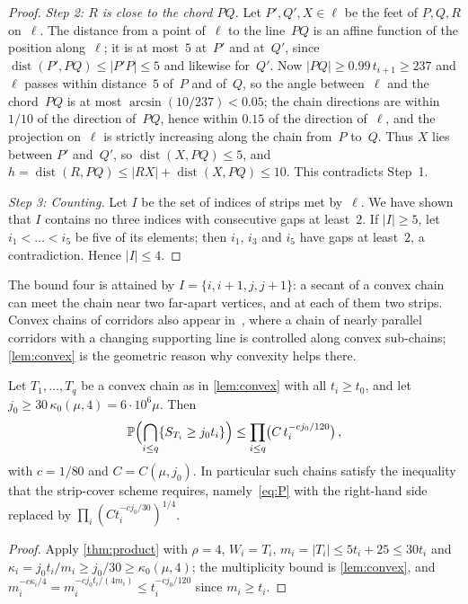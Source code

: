 \documentclass[11pt,letterpaper]{article}
\DeclareMathOperator{\dist}{dist}
\begin{document}
\begin{proof}
\emph{Step 2: $R$ is close to the chord $PQ$.} Let $P',Q',X\in\ell$ be the feet of $P,Q,R$ on~$\ell$. The distance from a point of~$\ell$ to the line~$PQ$ is an affine function of the position along~$\ell$; it is at most~$5$ at~$P'$ and at~$Q'$, since $\dist(P',PQ)\le\lvert P'P\rvert\le5$ and likewise for~$Q'$. Now $\lvert PQ\rvert\ge0.99\,t_{i+1}\ge237$ and $\ell$ passes within distance~$5$ of~$P$ and of~$Q$, so the angle between~$\ell$ and the chord~$PQ$ is at most $\arcsin(10/237)<0.05$; the chain directions are within $1/10$ of the direction of~$PQ$, hence within $0.15$ of the direction of~$\ell$, and the projection on~$\ell$ is strictly increasing along the chain from~$P$ to~$Q$. Thus $X$ lies between $P'$ and~$Q'$, so $\dist(X,PQ)\le5$, and $h=\dist(R,PQ)\le\lvert RX\rvert+\dist(X,PQ)\le10$. This contradicts Step~1.

\emph{Step 3: Counting.} Let $I$ be the set of indices of strips met by~$\ell$. We have shown that $I$ contains no three indices with consecutive gaps at least~$2$. If $\lvert I\rvert\ge5$, let $i_1<\dots<i_5$ be five of its elements; then $i_1$, $i_3$ and $i_5$ have gaps at least~$2$, a contradiction. Hence $\lvert I\rvert\le4$.
\end{proof}

The bound four is attained by $I=\{i,i+1,j,j+1\}$: a secant of a convex chain can meet the chain near two far-apart vertices, and at each of them two strips. Convex chains of corridors also appear in~\cite{CS26}, where a chain of nearly parallel corridors with a changing supporting line is controlled along convex sub-chains; \cref{lem:convex} is the geometric reason why convexity helps there.

\begin{corollary}
\label{cor:convex}
Let $T_1,\dots,T_q$ be a convex chain as in \cref{lem:convex} with all $t_i\ge t_0$, and let $j_0\ge30\,\kappa_0(\mu,4)=6\cdot10^6\mu$. Then
\begin{equation}
\label{eq:convexproduct}
  \P\Bigl(\bigcap_{i\le q}\{S_{T_i}\ge j_0t_i\}\Bigr)\le\prod_{i\le q}\bigl(C\,t_i^{-cj_0/120}\bigr)\,,
\end{equation}
with $c=1/80$ and $C=C(\mu,j_0)$. In particular such chains satisfy the inequality that the strip-cover scheme requires, namely~\eqref{eq:P} with the right-hand side replaced by $\prod_i(Ct_i^{-cj_0/30})^{1/4}$.
\end{corollary}

\begin{proof}
Apply \cref{thm:product} with $\rho=4$, $W_i=T_i$, $m_i=\lvert T_i\rvert\le5t_i+25\le30t_i$ and $\kappa_i=j_0t_i/m_i\ge j_0/30\ge\kappa_0(\mu,4)$; the multiplicity bound is \cref{lem:convex}, and $m_i^{-c\kappa_i/4}=m_i^{-cj_0t_i/(4m_i)}\le t_i^{-cj_0/120}$ since $m_i\ge t_i$.
\end{proof}
\end{document}

